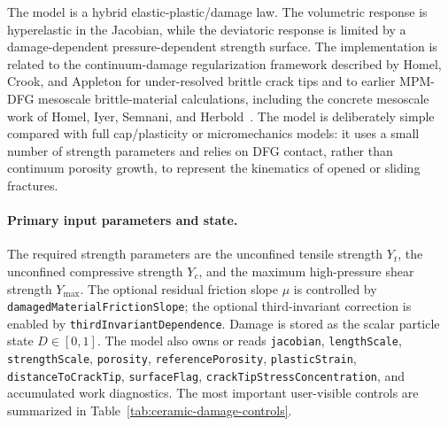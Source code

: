 The model is a hybrid elastic-plastic/damage law.  The volumetric response is hyperelastic in the Jacobian, while the deviatoric response is limited by a damage-dependent pressure-dependent strength surface.  The implementation is related to the continuum-damage regularization framework described by Homel, Crook, and Appleton for under-resolved brittle crack tips and to earlier MPM-DFG mesoscale brittle-material calculations, including the concrete mesoscale work of Homel, Iyer, Semnani, and Herbold~\cite{homelCrookAppleton2026sizeeffects,homel2022uhpc,homel2016dfg}.  The model is deliberately simple compared with full cap/plasticity or micromechanics models: it uses a small number of strength parameters and relies on DFG contact, rather than continuum porosity growth, to represent the kinematics of opened or sliding fractures.

\paragraph{Primary input parameters and state.}
The required strength parameters are the unconfined tensile strength \(Y_t\), the unconfined compressive strength \(Y_c\), and the maximum high-pressure shear strength \(Y_{\max}\).  The optional residual friction slope \(\mu\) is controlled by \texttt{damagedMaterialFrictionSlope}; the optional third-invariant correction is enabled by \texttt{thirdInvariantDependence}.  Damage is stored as the scalar particle state \(D\in[0,1]\).  The model also owns or reads \texttt{jacobian}, \texttt{lengthScale}, \texttt{strengthScale}, \texttt{porosity}, \texttt{referencePorosity}, \texttt{plasticStrain}, \texttt{distanceToCrackTip}, \texttt{surfaceFlag}, \texttt{crackTipStressConcentration}, and accumulated work diagnostics.  The most important user-visible controls are summarized in Table~\ref{tab:ceramic-damage-controls}.

